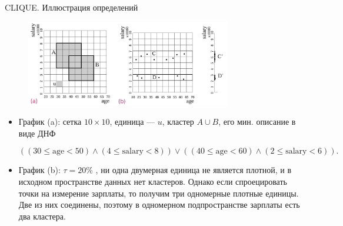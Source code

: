 \documentclass[unicode, notheorems, handout]{beamer}
\begin{document}
\begin{frame}{CLIQUE. Иллюстрация определений}

     \begin{figure}[h]
        \centering
        \includegraphics[width=0.8\textwidth]{clique.pdf} 
    \end{figure}
\vspace{-2ex}

\footnotesize
\begin{itemize}
    \item[\ding{87}] График (a): сетка $10\times 10$, единица --- $u$, кластер $A\cup B$, его мин. описание в виде ДНФ 
    \begin{footnotesize}
    $$ ((30 \leq \text{age}  < 50) \land (4 \leq  \text{salary} < 8)) \vee ((40 \leq  \text{age}  < 60) \land (2 \leq  \text{salary} < 6)).$$
    \end{footnotesize}
    \item[\ding{87}] График (b): $\tau=20\%$ , ни одна двумерная единица не является плотной, и в исходном пространстве данных нет кластеров.   Однако если спроецировать точки на измерение зарплаты, то получим три одномерные плотные единицы. Две из них соединены, поэтому в одномерном подпространстве зарплаты есть два кластера.
\end{itemize}

\end{frame}
\end{document}
